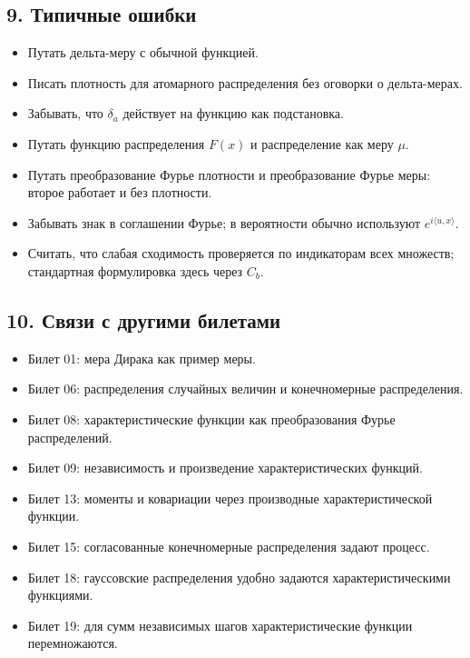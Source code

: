 \documentclass[
  11pt,
  a4paper,
]{article}
\providecommand{\tightlist}{%
  \setlength{\itemsep}{0pt}\setlength{\parskip}{0pt}}
\begin{document}
\subsection{9. Типичные
ошибки}\label{ux442ux438ux43fux438ux447ux43dux44bux435-ux43eux448ux438ux431ux43aux438}

\begin{itemize}
\tightlist
\item
  Путать дельта-меру с обычной функцией.
\item
  Писать плотность для атомарного распределения без оговорки о
  дельта-мерах.
\item
  Забывать, что \(\delta_a\) действует на функцию как подстановка.
\item
  Путать функцию распределения \(F(x)\) и распределение как меру
  \(\mu\).
\item
  Путать преобразование Фурье плотности и преобразование Фурье меры:
  второе работает и без плотности.
\item
  Забывать знак в соглашении Фурье; в вероятности обычно используют
  \(e^{i\langle u,x\rangle}\).
\item
  Считать, что слабая сходимость проверяется по индикаторам всех
  множеств; стандартная формулировка здесь через \(C_b\).
\end{itemize}

\subsection{10. Связи с другими
билетами}\label{ux441ux432ux44fux437ux438-ux441-ux434ux440ux443ux433ux438ux43cux438-ux431ux438ux43bux435ux442ux430ux43cux438}

\begin{itemize}
\tightlist
\item
  Билет 01: мера Дирака как пример меры.
\item
  Билет 06: распределения случайных величин и конечномерные
  распределения.
\item
  Билет 08: характеристические функции как преобразования Фурье
  распределений.
\item
  Билет 09: независимость и произведение характеристических функций.
\item
  Билет 13: моменты и ковариации через производные характеристической
  функции.
\item
  Билет 15: согласованные конечномерные распределения задают процесс.
\item
  Билет 18: гауссовские распределения удобно задаются
  характеристическими функциями.
\item
  Билет 19: для сумм независимых шагов характеристические функции
  перемножаются.
\end{itemize}
\end{document}
